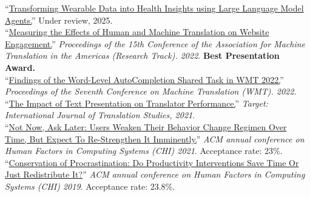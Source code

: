 ``\href{https://arxiv.org/pdf/2406.06464}{Transforming Wearable Data into Health Insights using Large Language Model Agents.}'' Under review, 2025.\\

``\href{https://aclanthology.org/2022.amta-research.23.pdf}{Measuring the Effects of Human and Machine Translation on Website Engagement.}'' \emph{Proceedings of the 15th Conference of the Association for Machine Translation in the Americas (Research Track). 2022}. \textbf{Best Presentation Award.}\\

``\href{https://aclanthology.org/2022.wmt-1.75.pdf}{Findings of the Word-Level AutoCompletion Shared Task in WMT 2022.}'' \emph{Proceedings of the Seventh Conference on Machine Translation (WMT). 2022.}\\

``\href{https://arxiv.org/pdf/2011.05978.pdf}{The Impact of Text Presentation on Translator Performance.}'' \emph{Target: International Journal of Translation Studies, 2021}.\\

``\href{https://hci.stanford.edu/publications/2021/notnow/notnowasklater.pdf}{Not Now, Ask Later: Users Weaken Their Behavior Change Regimen Over Time, But Expect To Re-Strengthen It Imminently.}'' \emph{ACM annual conference on Human Factors in Computing Systems (CHI) 2021}. Acceptance rate: 23\%.\\ %

``\href{https://hci.stanford.edu/publications/2019/conservation/conservation-chi2019.pdf}{Conservation of Procrastination: Do Productivity Interventions Save Time Or Just Redistribute It?}'' \emph{ACM annual conference on Human Factors in Computing Systems (CHI) 2019}. Acceptance rate: 23.8\%.\\ %

